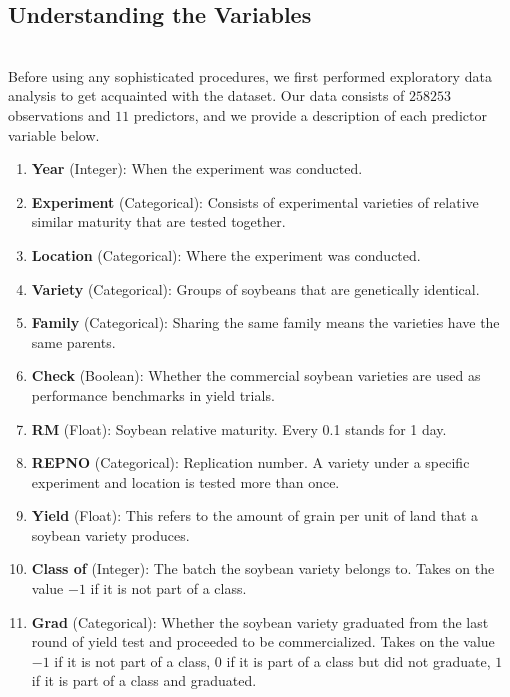 \documentclass[psamsfonts]{amsart}
\begin{document}
\subsection*{Understanding the Variables}
\hfill \\

 Before using any sophisticated procedures, we first performed exploratory data analysis to get acquainted with the dataset. Our data consists of $258253$ observations and $11$ predictors, and we provide a description of each predictor variable below.\\

\begin{enumerate}
    \item \textbf{Year} (Integer): When the experiment was conducted.
    \item \textbf{Experiment} (Categorical): Consists of experimental varieties of relative similar maturity that are tested together.
    \item \textbf{Location} (Categorical): Where the experiment was conducted. 
    \item \textbf{Variety} (Categorical): Groups of soybeans that are genetically identical. 
    \item \textbf{Family} (Categorical): Sharing the same family means the varieties have the same parents.
    \item \textbf{Check} (Boolean): Whether the commercial soybean varieties are used as performance benchmarks in yield trials. 
    \item \textbf{RM} (Float): Soybean relative maturity. Every 0.1 stands for 1 day.
    \item \textbf{REPNO} (Categorical): Replication number. A variety under a specific experiment and location is tested more than once.
    \item \textbf{Yield} (Float): This refers to the amount of grain per unit of land that a soybean variety produces. 
    \item \textbf{Class of} (Integer): The batch the soybean variety belongs to. Takes on the value $-1$ if it is not part of a class.
    \item \textbf{Grad} (Categorical): Whether the soybean variety graduated from the last round of yield test and proceeded to be commercialized. Takes on the value $-1$ if it is not part of a class, $0$ if it is part of a class but did not graduate, $1$ if it is part of a class and graduated.\\
\end{enumerate}
\end{document}
